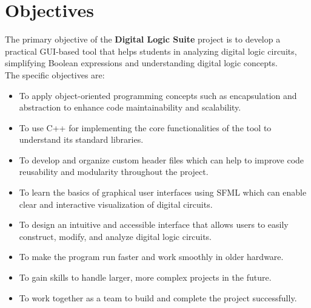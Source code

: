 \section{Objectives}

The primary objective of the \textbf{Digital Logic Suite} project is to develop a practical GUI-based tool that helps students in analyzing digital logic circuits, simplifying Boolean expressions and understanding digital logic concepts.\\
The specific objectives are:

\begin{itemize}
      \item To apply object-oriented programming concepts such as encapsulation and abstraction to enhance code maintainability and scalability.

      \item To use C++ for implementing the core functionalities of the tool to understand its standard libraries.

      \item To develop and organize custom header files which can help to improve code reusability and modularity throughout the project.

      \item To learn the basics of graphical user interfaces using SFML which can enable clear and interactive visualization of digital circuits.

      \item To design an intuitive and accessible interface that allows users to easily construct, modify, and analyze digital logic circuits.

      \item To make the program run faster and work smoothly in older hardware.

      \item To gain skills to handle larger, more complex projects in the future.

      \item To work together as a team to build and complete the project successfully.

\end{itemize}
\clearpage